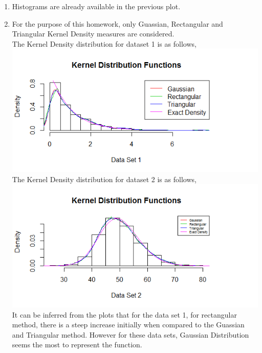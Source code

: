 \documentclass{article}
\begin{document}
\begin{enumerate}
\begin{enumerate}
\begin{enumerate}
\end{enumerate}
\item Histograms are already available in the previous plot.
\item For the purpose of this homework, only Guassian, Rectangular and Triangular Kernel Density measures are considered.
\\The Kernel Density distribution for dataset 1 is as follows,\\
\includegraphics[scale=0.5]{kernel1}
\\The Kernel Density distribution for dataset 2 is as follows,\\
\includegraphics[scale=0.5]{kernel2}
It can be inferred from the plots that for the data set 1, for rectangular method, there is a steep increase initially when compared to the Guassian and Triangular method. However for these data sets, Gaussian Distribution seems the most to represent the function.
\end{enumerate}
\end{enumerate}
\end{document}

